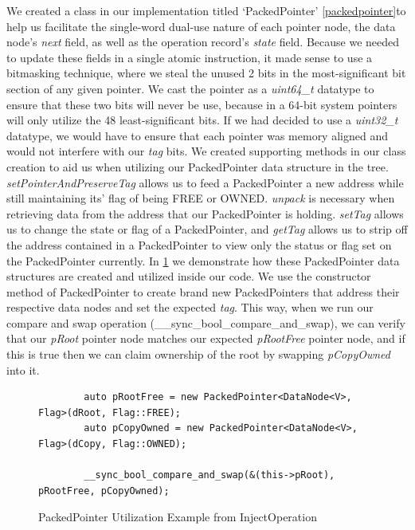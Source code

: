 \documentclass[letterpaper, 10 pt, conference]{ieeeconf}
\begin{document}
	We created a class in our implementation titled `PackedPointer' \ref{packedpointer}to help us facilitate the single-word dual-use nature of each pointer node, the data node's \textit{next} field, as well as the operation record's \textit{state} field. Because we needed to update these fields in a single atomic instruction, it made sense to use a bitmasking technique, where we steal the unused 2 bits in the most-significant bit section of any given pointer. We cast the pointer as a \textit{uint64\_t} datatype to ensure that these two bits will never be use, because in a 64-bit system pointers will only utilize the 48 least-significant bits. If we had decided to use a \textit{uint32\_t} datatype, we would have to ensure that each pointer was memory aligned and would not interfere with our \textit{tag} bits. We created supporting methods in our class creation to aid us when utilizing our PackedPointer data structure in the tree. \textit{setPointerAndPreserveTag} allows us to feed a PackedPointer a new address while still maintaining its' flag of being FREE or OWNED. \textit{unpack} is necessary when retrieving data from the address that our PackedPointer is holding. \textit{setTag} allows us to change the state or flag of a PackedPointer, and \textit{getTag} allows us to strip off the address contained in a PackedPointer to view only the status or flag set on the PackedPointer currently. In \ref{packedpointerexample} we demonstrate how these PackedPointer data structures are created and utilized inside our code. We use the constructor method of PackedPointer to create brand new PackedPointers that address their respective data nodes and set the expected \textit{tag}. This way, when we run our compare and swap operation (\_\_sync\_bool\_compare\_and\_swap), we can verify that our \textit{pRoot} pointer node matches our expected \textit{pRootFree} pointer node, and if this is true then we can claim ownership of the root by swapping \textit{pCopyOwned} into it.
	
	\begin{figure}
		\begin{lstlisting}
		auto pRootFree = new PackedPointer<DataNode<V>, Flag>(dRoot, Flag::FREE);
		auto pCopyOwned = new PackedPointer<DataNode<V>, Flag>(dCopy, Flag::OWNED);
		
		__sync_bool_compare_and_swap(&(this->pRoot), pRootFree, pCopyOwned);
		\end{lstlisting}
		\caption{PackedPointer Utilization Example from InjectOperation}
		\label{packedpointerexample}
	\end{figure}
\end{document}
